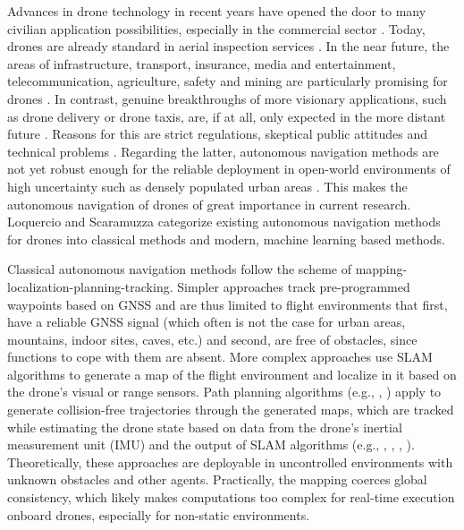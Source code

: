 Advances in drone technology in recent years
have opened the door to many civilian application possibilities,
especially in the commercial sector \cite{Dunn}.
Today, drones are already standard in 
aerial inspection services
\cite{Cohn, Equinox, Abuhasira}.
In the near future, the areas of
infrastructure,
transport,
insurance,
media and entertainment,
telecommunication,
agriculture,
safety
and mining 
are particularly promising for drones \cite{Mazur2016a}.
In contrast, 
genuine breakthroughs of more visionary applications, 
such as drone delivery or drone taxis,
are, if at all, only expected in the more distant future \cite{Rosen2019}.
Reasons for this are strict
regulations, skeptical public attitudes
and technical problems \cite{Rosen2019}.
Regarding the latter,
autonomous navigation methods are not yet 
robust enough for the reliable deployment in 
open-world environments of high uncertainty such as
densely populated urban areas \cite{brunner2019urban}.
This makes the autonomous navigation of drones
of great importance in current research.
Loquercio and Scaramuzza \cite{Loquercio2018a} 
categorize existing autonomous navigation methods for drones 
into classical methods and modern, machine learning based methods.

Classical autonomous navigation methods
follow the scheme of mapping-localization-planning-tracking.
Simpler approaches track pre-programmed waypoints based on GNSS
and are thus limited to flight environments that
first, have a reliable GNSS signal
(which often is not the case for 
urban areas, mountains, indoor sites, caves, etc.)
and second, are free of obstacles,
since functions to cope with them are absent.
More complex approaches use SLAM algorithms
to generate a map of the flight environment
and localize in it
based on the drone's visual or range sensors. \cite{MurArtal2015}
Path planning algorithms 
(e.g., \cite{Bircher2016}, \cite{Cieslewski2017})
apply to generate collision-free 
trajectories through the generated maps,
which are tracked
while estimating the drone state
based on data from the drone's inertial measurement unit (IMU)
and the output of SLAM algorithms 
(e.g., \cite{Lin2017}, \cite{Scaramuzza2014}, \cite{Sa2018}, \cite{Loianno2017}).
Theoretically, these approaches are deployable
in uncontrolled environments with unknown obstacles and other agents.
Practically, 
the mapping coerces global consistency,
which likely makes computations too complex 
for real-time execution onboard drones,
especially for non-static environments.

